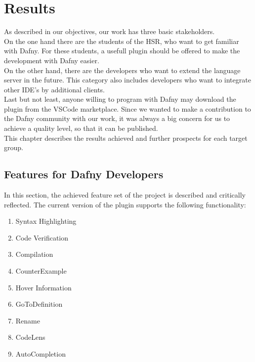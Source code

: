 \section{Results}
\label{section:results}


As described in our objectives, our work has three basic stakeholders. \\

On the one hand there are the students of the HSR, who want to get familiar with Dafny.
For these students, a usefull plugin should be offered to make the development with Dafny easier. \\

On the other hand, there are the developers who want to extend the language server in the future.
This category also includes developers who want to integrate other IDE's by additional clients.\\

Last but not least, anyone willing to program with Dafny may download the plugin from the VSCode marketplace.
Since we wanted to make a contribution to the Dafny community with our work,
it was always a big concern for us to achieve a quality level, so that it can be published.\\

This chapter describes the results achieved and further prospects for each target group.

\subsection{Features for Dafny Developers}
In this section, the achieved feature set of the project is described and critically reflected.
The current version of the plugin supports the following functionality:
\begin{enumerate}
    \item Syntax Highlighting
    \item Code Verification
    \item Compilation
    \item CounterExample
    \item Hover Information
    \item GoToDefinition
    \item Rename
    \item CodeLens
    \item AutoCompletion
\end{enumerate}


